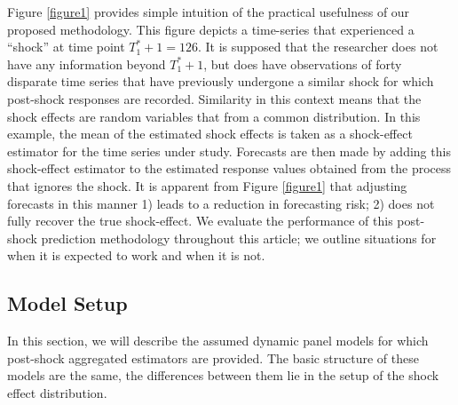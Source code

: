 \documentclass[11pt]{article}
\theoremstyle{definition}
\begin{document}
Figure \ref{figure1} provides simple intuition of the practical usefulness of our proposed methodology. This figure depicts a time-series that experienced a ``shock'' at time point $T_1^*+1 = 126$. It is supposed that the researcher does not have any information beyond $T_1^*+1$, but does have observations of forty disparate time series that have previously undergone a similar shock for which post-shock responses are recorded. Similarity in this context means that the shock effects are random variables that from a common distribution.
In this example, the mean of the estimated shock effects is taken as a shock-effect estimator for the time series under study. Forecasts are then made by adding this shock-effect estimator to the estimated response values obtained from the process that ignores the shock. It is apparent from Figure \ref{figure1} that adjusting forecasts in this manner 1) leads to a reduction in forecasting risk; 2) does not fully recover the true shock-effect. We evaluate the performance of this post-shock prediction methodology throughout this article; we outline situations for when it is expected to work and when it is not.







\subsection{Model Setup}

\label{modelsetup}

In this section, we will describe the assumed dynamic panel models for which 
post-shock aggregated estimators are provided. The basic structure of these models 
are the same, the differences between them lie in the setup of the shock effect 
distribution.
\end{document}
